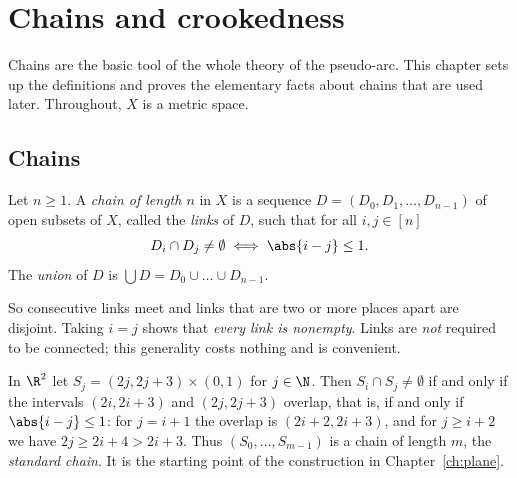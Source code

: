 \chapter{Chains and crookedness}\label{ch:chains}

Chains are the basic tool of the whole theory of the pseudo-arc. This chapter sets up the
definitions and proves the elementary facts about chains that are used later. Throughout,
$X$ is a metric space.

\section{Chains}

\begin{definition}[Chain]\label{def:chain}
Let $n\ge1$. A \emph{chain of length $n$} in $X$ is a sequence $D=(D_0,D_1,\dots,D_{n-1})$ of
open subsets of $X$, called the \emph{links} of $D$, such that for all $i,j\in[n]$
\[
D_i\cap D_j\neq\emptyset\iff\abs{i-j}\le1 .
\]
The \emph{union} of $D$ is $\bigcup D=D_0\cup\dots\cup D_{n-1}$.
\end{definition}

So consecutive links meet and links that are two or more places apart are disjoint. Taking
$i=j$ shows that \emph{every link is nonempty}. Links are \emph{not} required to be connected;
this generality costs nothing and is convenient.


\begin{example}\label{ex:std-chain}
In $\R^2$ let $S_j=(2j,2j+3)\times(0,1)$ for $j\in\N$. Then $S_i\cap S_j\neq\emptyset$ if and only
if the intervals $(2i,2i+3)$ and $(2j,2j+3)$ overlap, that is, if and only if $\abs{i-j}\le1$:
for $j=i+1$ the overlap is $(2i+2,2i+3)$, and for $j\ge i+2$ we have $2j\ge2i+4>2i+3$. Thus
$(S_0,\dots,S_{m-1})$ is a chain of length $m$, the \emph{standard chain}. It is the starting
point of the construction in Chapter~\ref{ch:plane}.
\end{example}

